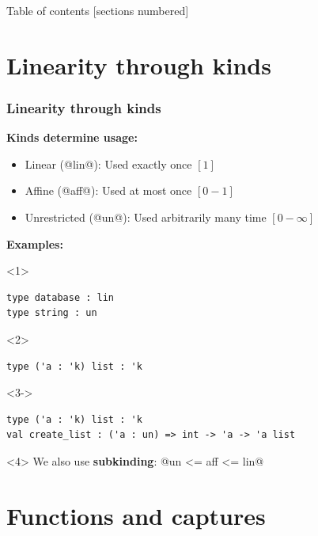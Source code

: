 \documentclass[aspectratio=169,dvipsnames,svgnames,10pt]{beamer}
\begin{document}
\begin{frame}{Table of contents}
  [sections numbered]
  \tableofcontents[hideallsubsections]
\end{frame}

\section{Linearity through kinds}

\begin{frame}[fragile]
  \frametitle{Linearity through kinds}
  
  \textbf{Kinds determine usage:}
  \begin{itemize}
  \item Linear (@lin@): Used exactly once $[1]$
  \item Affine (@aff@): Used at most once $[0-1]$
  \item Unrestricted (@un@): Used arbitrarily many time $[0-\infty]$
  \end{itemize}

  \textbf{Examples:}
  \begin{onlyenv}<1>
\begin{verbatim}
type database : lin
type string : un
\end{verbatim}
  \end{onlyenv}
  \begin{onlyenv}<2>
\begin{verbatim}
type ('a : 'k) list : 'k
\end{verbatim}
  \end{onlyenv}
  \begin{onlyenv}<3->
\begin{verbatim}
type ('a : 'k) list : 'k
val create_list : ('a : un) => int -> 'a -> 'a list
\end{verbatim}
    
    \begin{onlyenv}<4>
      We also use \textbf{subkinding}: @un <= aff <= lin@
    \end{onlyenv}
  \end{onlyenv}
\end{frame}


\section{Functions and captures}
\end{document}
